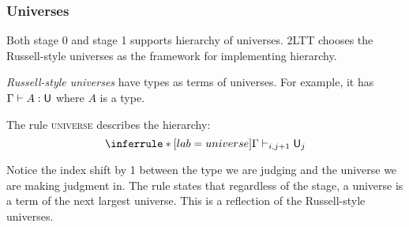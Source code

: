 \subsubsection{Universes}
    Both stage 0 and stage 1 supports hierarchy of universes. 2LTT chooses the Russell-style universes as the framework for implementing hierarchy.

    
    \begin{definition}
        \emph{Russell-style universes} have types as terms of universes. For example, it has $\Gamma \vdash A : \mathsf{U}$ where $A$ is a type. %
    \end{definition}
    
    The rule \textsc{universe} describes the hierarchy:
    $$\inferrule*[lab=universe]
                 {\\}
                 {\Gamma \vdash_{i,j+1} \U_j}$$

    Notice the index shift by 1 between the type we are judging and the universe we are making judgment in. The rule states that regardless of the stage, a universe is a term of the next largest universe. This is a reflection of the Russell-style universes.


